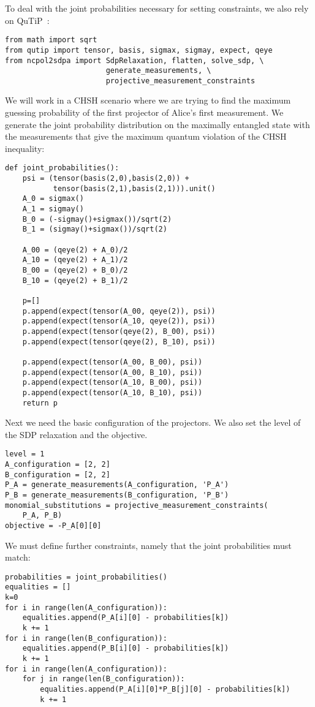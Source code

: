 \documentclass{article}
\begin{document}
To deal with the joint probabilities necessary for setting constraints, we also rely on QuTiP~\citep{johansson2013qutip}:
\begin{verbatim}
from math import sqrt
from qutip import tensor, basis, sigmax, sigmay, expect, qeye
from ncpol2sdpa import SdpRelaxation, flatten, solve_sdp, \
                       generate_measurements, \
                       projective_measurement_constraints
\end{verbatim}
We will work in a CHSH scenario where we are trying to find the maximum guessing probability of the first projector of Alice's first measurement. We generate the joint probability distribution on the maximally entangled state with the measurements that give the maximum quantum violation of the CHSH inequality:
\begin{verbatim}
def joint_probabilities():
    psi = (tensor(basis(2,0),basis(2,0)) + 
           tensor(basis(2,1),basis(2,1))).unit()
    A_0 = sigmax()
    A_1 = sigmay()
    B_0 = (-sigmay()+sigmax())/sqrt(2)
    B_1 = (sigmay()+sigmax())/sqrt(2)

    A_00 = (qeye(2) + A_0)/2
    A_10 = (qeye(2) + A_1)/2
    B_00 = (qeye(2) + B_0)/2
    B_10 = (qeye(2) + B_1)/2

    p=[]
    p.append(expect(tensor(A_00, qeye(2)), psi))
    p.append(expect(tensor(A_10, qeye(2)), psi))
    p.append(expect(tensor(qeye(2), B_00), psi))
    p.append(expect(tensor(qeye(2), B_10), psi))

    p.append(expect(tensor(A_00, B_00), psi))
    p.append(expect(tensor(A_00, B_10), psi))
    p.append(expect(tensor(A_10, B_00), psi))
    p.append(expect(tensor(A_10, B_10), psi))
    return p
\end{verbatim}
Next we need the basic configuration of the projectors. We also set the level of the SDP relaxation and the objective. 
\begin{verbatim}
level = 1
A_configuration = [2, 2]
B_configuration = [2, 2]
P_A = generate_measurements(A_configuration, 'P_A')
P_B = generate_measurements(B_configuration, 'P_B')
monomial_substitutions = projective_measurement_constraints(
    P_A, P_B)
objective = -P_A[0][0]
\end{verbatim}
We must define further constraints, namely that the joint probabilities must match: 
\begin{verbatim}
probabilities = joint_probabilities()
equalities = []
k=0
for i in range(len(A_configuration)):
    equalities.append(P_A[i][0] - probabilities[k])
    k += 1
for i in range(len(B_configuration)):
    equalities.append(P_B[i][0] - probabilities[k])
    k += 1
for i in range(len(A_configuration)):
    for j in range(len(B_configuration)):
        equalities.append(P_A[i][0]*P_B[j][0] - probabilities[k])
        k += 1
\end{verbatim}
\end{document}
